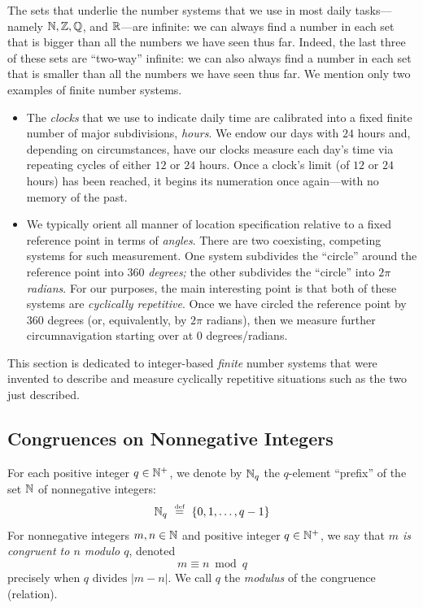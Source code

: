 The sets that underlie the number systems that we use in most daily tasks---namely $\mathbb{N}, \mathbb{Z}, \mathbb{Q}$, and $\mathbb{R}$---are infinite: we can always find a number in each set that is bigger than all the numbers we have seen thus far.  Indeed, the last three of these sets are ``two-way'' infinite: we can also always find a number in each set that is smaller than all the numbers we have seen thus far.  We mention only two examples of finite number systems.
\begin{itemize}
\item
The {\em clocks} that we use to indicate daily time are calibrated into a fixed finite number of major subdivisions, {\em hours}.  We endow our days with $24$ hours and, depending on circumstances, have our clocks measure each day's time via repeating cycles of either $12$ or $24$ hours.  Once a clock's limit (of $12$ or $24$ hours) has been reached, it begins its numeration once again---with no memory of the past.

\medskip\item
We typically orient all manner of location specification relative to a fixed reference point in terms of {\em angles}.  There are two coexisting, competing systems for such measurement.  One system subdivides the ``circle'' around the reference point into $360$ {\em degrees;} the other subdivides the ``circle'' into $2 \pi$ {\em radians}.  For our purposes, the main interesting point is that both of these systems are {\em cyclically repetitive}.  Once we have circled the reference point by $360$ degrees (or, equivalently, by $2 \pi$ radians), then we measure further circumnavigation starting over at $0$ degrees/radians.
\end{itemize}

This section is dedicated to integer-based {\em finite} number systems that were invented to describe and measure cyclically repetitive situations such as the two just described.

\subsection{Congruences on Nonnegative Integers}
\label{sec:congruences}

 
For each positive integer $q \in \mathbb{N}^+$, we denote by $\mathbb{N}_q$ the $q$-element ``prefix'' of the set $\mathbb{N}$ of nonnegative integers:
\[ \mathbb{N}_q \ \stackrel{\mbox{{\tiny def}}}{=} \ \{0, 1, \ldots, q-1\}  \]
For nonnegative integers $m, n \in \mathbb{N}$ and positive integer $q \in \mathbb{N}^+$, we say that {\em $m$ is congruent to $n$ modulo $q$}, denoted
\[ m \equiv n \bmod q  \]
precisely when $q \mbox{ divides } |m-n|$.  We call $q$ the {\it modulus} of the congruence (relation).


